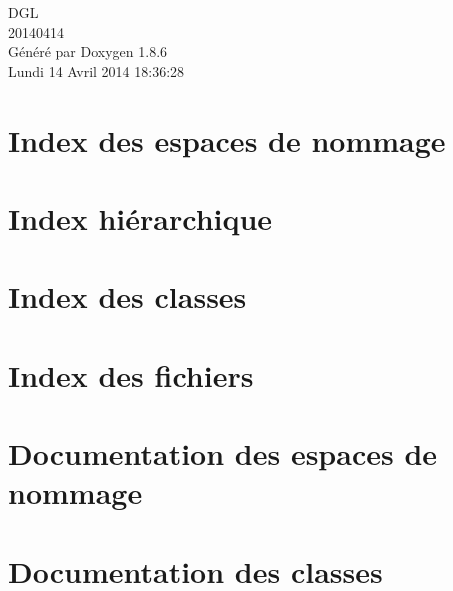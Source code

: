 \documentclass[twoside]{book}
\newcommand{\clearemptydoublepage}{%
  \newpage{\pagestyle{empty}\cleardoublepage}%
}
\begin{document}
\hypersetup{pageanchor=false}
\begin{titlepage}
\vspace*{7cm}
\begin{center}%
{\Large D\-G\-L \\[1ex]\large 20140414 }\\
\vspace*{1cm}
{\large Généré par Doxygen 1.8.6}\\
\vspace*{0.5cm}
{\small Lundi 14 Avril 2014 18:36:28}\\
\end{center}
\end{titlepage}
\clearemptydoublepage
\tableofcontents
\clearemptydoublepage
{}
\hypersetup{pageanchor=true}

\chapter{Index des espaces de nommage}

\chapter{Index hiérarchique}

\chapter{Index des classes}

\chapter{Index des fichiers}

\chapter{Documentation des espaces de nommage}

\chapter{Documentation des classes}


























\end{document}
